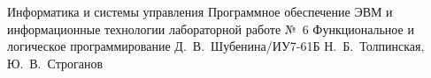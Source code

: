 \documentclass{bmstu}
\begin{document}
	\makereporttitle
	{Информатика и системы управления} %
	{Программное обеспечение ЭВМ и информационные технологии} %
	{лабораторной работе №~6} %
	{Функциональное и логическое программирование} %
	{} %
	{} %
	{Д.~В.~Шубенина/ИУ7-61Б} %
	{Н.~Б.~Толпинская, Ю.~В.~Строганов} %
	\maketableofcontents
	
\end{document}
